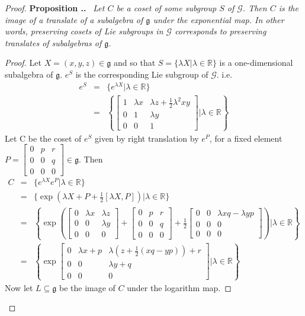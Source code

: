 \documentclass[honours]{UNSWthesis}
\newcommand{\R}{\mathbb{R}}
\newcommand{\G}{\mathcal{G}}
\newcommand{\g}{\mathfrak{g}}
\newcommand{\1}{\mathbf{e}_{1}}
\newcommand{\2}{\mathbf{e}_{3}}
\newcommand{\3}{\mathbf{e}_{3}}
\newcounter{Item}[section]
\newenvironment{Proposition}{\medskip
                            \refstepcounter{Item}
                            \noindent
                           {\bf Proposition \thesection.\theItem.}\ %
                            \begingroup \sl}
                           {\endgroup\medskip}
\begin{document}
\begin{proof}
\begin{Proposition}
Let $C$ be a coset of some subgroup $S$ of $\G$. Then $C$ is the image of a translate of a subalgebra of $\g$ under the exponential map. In other words, preserving cosets of Lie subgroups in $\G$ corresponds to preserving translates of subalgebras of $\g$.
\end{Proposition}

\begin{proof}
Let $X=(x,y,z) \in \g$ and so that $S=\{ \lambda X | \lambda \in \R \}$ is a one-dimensional subalgebra of $\g$. $e^{S}$ is the corresponding Lie subgroup of $\G$. i.e.
\begin{eqnarray*}
e^{S} &=& \{ e^{\lambda X}| \lambda \in \R \} \\
&=& \left\lbrace \begin{bmatrix}
1 & \lambda x & \lambda z + \frac{1}{2} \lambda^{2}xy \\
0 & 1 & \lambda y \\
0 & 0 & 1
\end{bmatrix} \bigg| \lambda \in \R \right\rbrace
\end{eqnarray*}
Let C be the coset of $e^{S}$ given by right translation by $e^{P}$, for a fixed element $P = \begin{bmatrix}
0 & p & r \\
0 & 0 & q \\
0 & 0 & 0
\end{bmatrix} \in \g$. Then 
\begin{eqnarray*}
C &=& \{e^{\lambda X}e^{P}|\lambda \in \R \} \\
&=& \{ \exp( \lambda X + P + \frac{1}{2}[\lambda X,P]) | \lambda \in \R \} \\
&=& \left\lbrace \exp \left( 
\begin{bmatrix}
0 & \lambda x & \lambda z \\
0 & 0 & \lambda y \\
0 & 0 & 0
\end{bmatrix} + 
\begin{bmatrix}
0 & p & r \\
0 & 0 & q \\
0 & 0 & 0
\end{bmatrix} + 
\frac{1}{2}
\begin{bmatrix}
0 & 0 & \lambda xq - \lambda yp \\
0 & 0 & 0 \\
0 & 0 & 0
\end{bmatrix}
\right)
 \bigg| \lambda \in \R \right\rbrace \\
&=& \left\lbrace \exp
\begin{bmatrix}
0 & \lambda x + p & \lambda (z+\frac{1}{2}(xq-yp))+r \\
0 & 0 & \lambda y +q \\
0 & 0 & 0
\end{bmatrix}
\bigg| \lambda \in \R \right\rbrace
\end{eqnarray*}
Now let $L \subseteq \g$ be the image of $C$ under the logarithm map.


\end{proof}
\end{proof}
\end{document}
